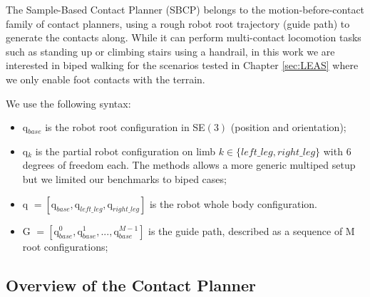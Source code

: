 The Sample-Based Contact Planner (SBCP) \cite{AcyclicCP} belongs to the motion-before-contact family of contact planners, using a rough robot root trajectory (guide path) to generate the contacts along.
While it can perform multi-contact locomotion tasks such as standing up or climbing stairs using a handrail, in this work we are interested in biped walking for the scenarios tested in Chapter \ref{sec:LEAS} where we only enable foot contacts with the terrain.

\newpage

We use the following syntax:
\begin{itemize}
    \item q$_{base}$ is the robot root configuration in SE$(3)$ (position and orientation);
    \item q$_k$ is the partial robot configuration on limb $k\in\{left\_leg, right\_leg\}$ with 6 degrees of freedom each. The methods allows a more generic multiped setup but we limited our benchmarks to biped cases;
    \item q $= [\mbox{q}_{base},\mbox{q}_{left\_leg},\mbox{q}_{right\_leg}]$ is the robot whole body configuration.
    \item G $ = [\mbox{q}_{base}^0,\mbox{q}_{base}^1,..., \mbox{q}_{base}^{M-1}]$ is the guide path, described as a sequence of M root configurations;
\end{itemize}



\subsection{Overview of the Contact Planner}

